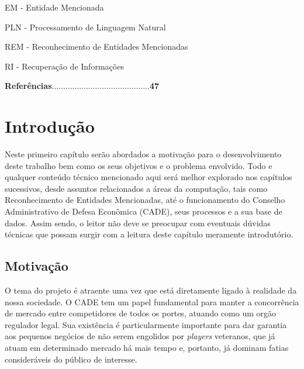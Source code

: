 \documentclass[11pt]{report}
\begin{document}
\vspace*{8px}
\noindent EM - Entidade Mencionada

\vspace*{8px}
\noindent PLN - Processamento de Linguagem Natural

\vspace*{8px}
\noindent REM - Reconhecimento de Entidades Mencionadas

\vspace*{8px}
\noindent RI - Recuperação de Informações

\pagebreak
\thispagestyle{empty}

\tableofcontents

\vspace*{10px}

\hspace*{-0.7cm}
\textbf{Referências}\thinspace\enspace.\enspace.\enspace.\enspace.\enspace.\enspace.\enspace.\enspace.\enspace.\enspace.\enspace.\enspace.\enspace.\enspace.\enspace.\enspace.\enspace.\enspace.\enspace.\enspace.\enspace.\enspace.\enspace.\enspace.\enspace.\enspace.\enspace.\enspace.\enspace.\enspace.\enspace.\enspace.\enspace.\enspace.\enspace.\enspace.\enspace.\enspace.\enspace.\enspace.\enspace.\enspace.\enspace.\thinspace\thinspace\enspace\textbf{47}

\pagebreak
\chapter{Introdução}
\indent\indent Neste primeiro capítulo serão abordados a motivação para o desenvolvimento deste trabalho bem como os seus objetivos e o problema envolvido.
Todo e qualquer conteúdo técnico mencionado aqui será melhor explorado nos capítulos sucessivos, desde assuntos relacionados a áreas da computação, tais como
Reconhecimento de Entidades Mencionadas, até o funcionamento do Conselho Administrativo de Defesa Econômica (CADE), seus processos e a sua base de dados. Assim sendo, o
leitor não deve se preocupar com eventuais dúvidas técnicas que possam surgir com a leitura deste capítulo meramente introdutório.

\section{Motivação}
\indent\indent O tema do projeto é atraente uma vez que está diretamente ligado à realidade da nossa sociedade. O CADE tem um papel
fundamental para manter a concorrência de mercado entre competidores de todos os portes, atuando como um orgão regulador legal. Sua existência é
particularmente importante para dar garantia aos pequenos negócios de não serem engolidos por \textit{players} veteranos, que
já atuam em determinado mercado há mais tempo e, portanto, já dominam fatias consideráveis do público de interesse.
\end{document}

